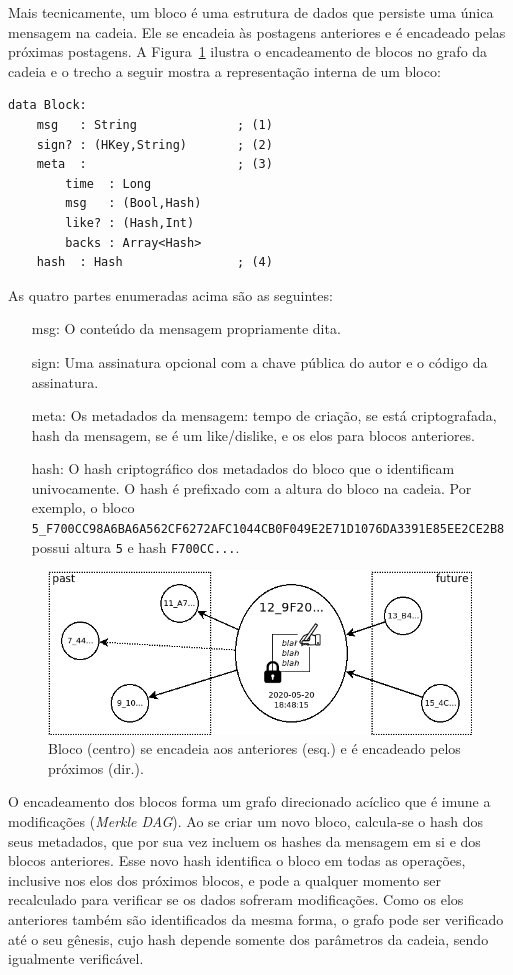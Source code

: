 \documentclass[12pt]{article}
\begin{document}
Mais tecnicamente, um bloco é uma estrutura de dados que persiste uma única
mensagem na cadeia.
Ele se encadeia às postagens anteriores e é encadeado pelas próximas postagens.
A Figura~\ref{fig.block} ilustra o encadeamento de blocos no grafo da cadeia e
o trecho a seguir mostra a representação interna de um bloco:
%
{\footnotesize
\begin{verbatim}
data Block:
    msg   : String              ; (1)
    sign? : (HKey,String)       ; (2)
    meta  :                     ; (3)
        time  : Long
        msg   : (Bool,Hash)
        like? : (Hash,Int)
        backs : Array<Hash>
    hash  : Hash                ; (4)
\end{verbatim}
}
%
As quatro partes enumeradas acima são as seguintes:
%
\begin{enumerate}
\item[msg:]  O conteúdo da mensagem propriamente dita.
\item[sign:] Uma assinatura opcional com a chave pública do autor e o código da
             assinatura.
\item[meta:] Os metadados da mensagem: tempo de criação, se está criptografada,
             hash da mensagem, se é um like/dislike, e os elos para blocos
             anteriores.
\item[hash:] O hash criptográfico dos metadados do bloco que o identificam
             univocamente. O hash é prefixado com a altura do bloco na cadeia.
             Por exemplo, o bloco
                {\scriptsize\texttt{5\_F700CC98A6BA6A562CF6272AFC1044CB0F049E2E71D1076DA3391E85EE2CE2B8}}
             possui altura \texttt{5} e hash \texttt{F700CC...}.
\end{enumerate}

\begin{figure}[ht]
\centering
\includegraphics[width=.65\textwidth]{block.png}
\caption{\scriptsize{Bloco (centro) se encadeia aos anteriores (esq.) e é encadeado
         pelos próximos (dir.).}}
\label{fig.block}
\end{figure}

O encadeamento dos blocos forma um grafo direcionado acíclico que é imune a
modificações (\emph{Merkle DAG}).
Ao se criar um novo bloco, calcula-se o hash dos seus metadados, que por sua
vez incluem os hashes da mensagem em si e dos blocos anteriores.
Esse novo hash identifica o bloco em todas as operações, inclusive nos elos dos
próximos blocos, e pode a qualquer momento ser recalculado para verificar se os
dados sofreram modificações.
Como os elos anteriores também são identificados da mesma forma, o grafo pode
ser verificado até o seu gênesis, cujo hash depende somente dos parâmetros da
cadeia, sendo igualmente verificável.
\end{document}
